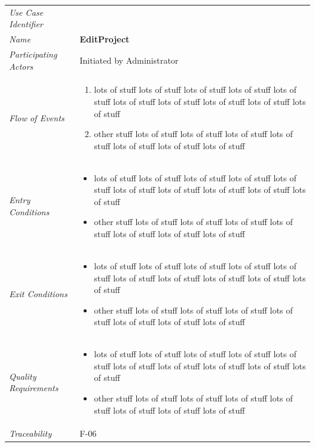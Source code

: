 \documentclass[12pt,letterpaper]{article}
\begin{document}
\begin{center}
	\begin{tabu} to 
		\toprule
		Use Case Identifier & \editproject{} \\
		Name & {\bf EditProject} \\
		Participating Actors & Initiated by Administrator \\
		Flow of Events & 
	    \begin{enumerate}[topsep=-1em]
		    \item lots of stuff lots of stuff lots of stuff lots of stuff lots of stuff lots of stuff lots of stuff lots of stuff lots of stuff lots of stuff
		    \item other stuff lots of stuff lots of stuff lots of stuff lots of stuff lots of stuff lots of stuff lots of stuff
		\end{enumerate} \\

		Entry Conditions &
		\begin{itemize}[topsep=-1em]
		    \item lots of stuff lots of stuff lots of stuff lots of stuff lots of stuff lots of stuff lots of stuff lots of stuff lots of stuff lots of stuff
		    \item other stuff lots of stuff lots of stuff lots of stuff lots of stuff lots of stuff lots of stuff lots of stuff
        \end{itemize} \\

		Exit Conditions &
		\begin{itemize}[topsep=-1em]
		    \item lots of stuff lots of stuff lots of stuff lots of stuff lots of stuff lots of stuff lots of stuff lots of stuff lots of stuff lots of stuff
		    \item other stuff lots of stuff lots of stuff lots of stuff lots of stuff lots of stuff lots of stuff lots of stuff
        \end{itemize} \\

		Quality Requirements &
		\begin{itemize}[topsep=-1em]
		    \item lots of stuff lots of stuff lots of stuff lots of stuff lots of stuff lots of stuff lots of stuff lots of stuff lots of stuff lots of stuff
		    \item other stuff lots of stuff lots of stuff lots of stuff lots of stuff lots of stuff lots of stuff lots of stuff
        \end{itemize} \\

		Traceability & F-06 \\
		\toprule
	\end{tabu}
\end{center}
\end{document}
